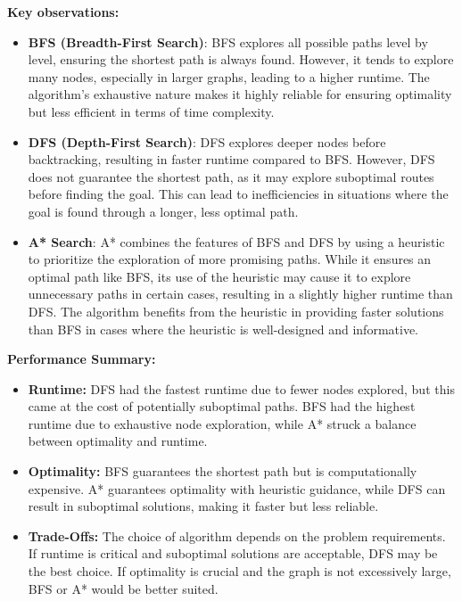 \documentclass[12pt]{article}
\begin{document}
\textbf{Key observations:}
\begin{itemize}
    \item \textbf{BFS (Breadth-First Search)}: BFS explores all possible paths level by level, ensuring the shortest path is always found. However, it tends to explore many nodes, especially in larger graphs, leading to a higher runtime. The algorithm's exhaustive nature makes it highly reliable for ensuring optimality but less efficient in terms of time complexity.

    \item \textbf{DFS (Depth-First Search)}: DFS explores deeper nodes before backtracking, resulting in faster runtime compared to BFS. However, DFS does not guarantee the shortest path, as it may explore suboptimal routes before finding the goal. This can lead to inefficiencies in situations where the goal is found through a longer, less optimal path.

    \item \textbf{A* Search}: A* combines the features of BFS and DFS by using a heuristic to prioritize the exploration of more promising paths. While it ensures an optimal path like BFS, its use of the heuristic may cause it to explore unnecessary paths in certain cases, resulting in a slightly higher runtime than DFS. The algorithm benefits from the heuristic in providing faster solutions than BFS in cases where the heuristic is well-designed and informative.
\end{itemize}

\textbf{Performance Summary:}
\begin{itemize}
    \item \textbf{Runtime:} DFS had the fastest runtime due to fewer nodes explored, but this came at the cost of potentially suboptimal paths. BFS had the highest runtime due to exhaustive node exploration, while A* struck a balance between optimality and runtime.
    \item \textbf{Optimality:} BFS guarantees the shortest path but is computationally expensive. A* guarantees optimality with heuristic guidance, while DFS can result in suboptimal solutions, making it faster but less reliable.
    \item \textbf{Trade-Offs:} The choice of algorithm depends on the problem requirements. If runtime is critical and suboptimal solutions are acceptable, DFS may be the best choice. If optimality is crucial and the graph is not excessively large, BFS or A* would be better suited.
\end{itemize}
\end{document}
